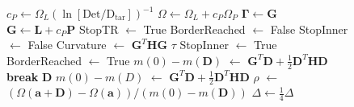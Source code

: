 \documentclass[aps,prl,reprint,amsmath,amssymb]{revtex4-1}
\begin{document}
\begin{figure}
\begin{algorithm}[H]
\begin{algorithmic}[1]
				\State $c_{P} \gets \Omega_{L}(\ln [\text{Det} / \text{D}_{\text{tar}} ])^{-1}$ 
			\EndIf
			\State $\Omega \gets \Omega_{L} + c_P \Omega_{P} $ 
				\State $\mathbf{\Gamma} \gets \mathbf{G}$ 
			\EndIf 
			\State $\mathbf{G} \gets \mathbf{L} + c_P \mathbf{P} $ 
				\State StopTR $\gets$ True
			\EndIf
                 \State BorderReached $\gets$ False 
                 \State StopInner $\gets$ False 
                 \Repeat {}
                    \State Curvature $\gets$  $\mathbf{G}^{T}\mathbf{H}\mathbf{G}$
                       \State $\tau$ 
                       \State StopInner $\gets$ True
                       \State BorderReached $\gets$ True
                       \State  $m(0)-m(\mathbf{D})$ $\gets$  $\mathbf{G}^{T}\mathbf{D}+\frac{1}{2}\mathbf{D}^{T}\mathbf{H}\mathbf{D}$
                       \State \textbf{break}
                    \Else
                       \State $\mathbf{D}$ 
                       \State  $m(0)-m(D)$ $\gets$  $\mathbf{G}^{T}\mathbf{D}+\frac{1}{2}\mathbf{D}^{T}\mathbf{H}\mathbf{D}$
                    \EndIf
                 \State $\rho$ $\gets$ $(\Omega(\mathbf{a}+\mathbf{D})-\Omega(\mathbf{a})) / (m(0)-m(\mathbf{D}))$
                    \State $\Delta \gets \frac{1}{4}\Delta$
                 \Else
   \end{algorithmic}
\end{algorithm}
\end{figure}
\end{document}
